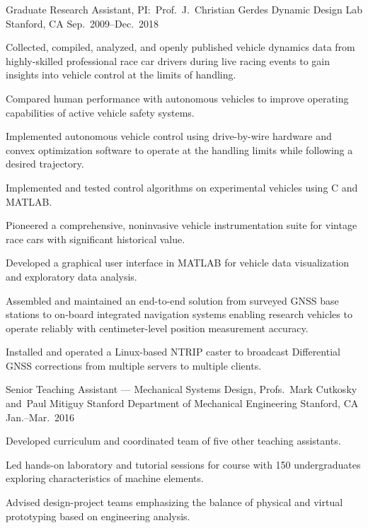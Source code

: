 \begin{cventries}
  \cventry%
    {Graduate Research Assistant, PI:\ Prof.~J.~Christian Gerdes}
    {Dynamic Design Lab}
    {Stanford, CA}
    {Sep.\ 2009--Dec.\ 2018}
    {
      \begin{cvitems}
        \item{Collected, compiled, analyzed, and openly published vehicle dynamics data from highly-skilled professional race car drivers during live racing events to gain insights into vehicle control at the limits of handling.}
        \item{Compared human performance with autonomous vehicles to improve operating capabilities of active vehicle safety systems.}
        \item{Implemented autonomous vehicle control using drive-by-wire hardware and convex optimization software to operate at the handling limits while following a desired trajectory.}
        \item{Implemented and tested control algorithms on experimental vehicles using C and MATLAB\@.}
        \item{Pioneered a comprehensive, noninvasive vehicle instrumentation suite for vintage race cars with significant historical value.}
        \item{Developed a graphical user interface in MATLAB for vehicle data visualization and exploratory data analysis.}
        \item{Assembled and maintained an end-to-end solution from surveyed GNSS base stations to on-board integrated navigation systems enabling research vehicles to operate reliably with centimeter-level position measurement accuracy.}
        \item{Installed and operated a Linux-based NTRIP caster to broadcast Differential GNSS corrections from multiple servers to multiple clients.}
      \end{cvitems}
    }

  \cventry%
    {Senior Teaching Assistant --- Mechanical Systems Design, Profs.~Mark Cutkosky and~Paul Mitiguy}
    {Stanford Department of Mechanical Engineering}
    {Stanford, CA}
    {Jan.--Mar.\ 2016}
    {
      \begin{cvitems}
        \item{Developed curriculum and coordinated team of five other teaching assistants.}
        \item{Led hands-on laboratory and tutorial sessions for course with 150 undergraduates exploring characteristics of machine elements.}
        \item{Advised design-project teams emphasizing the balance of physical and virtual prototyping based on engineering analysis.}
      \end{cvitems}
    }


\end{cventries}
